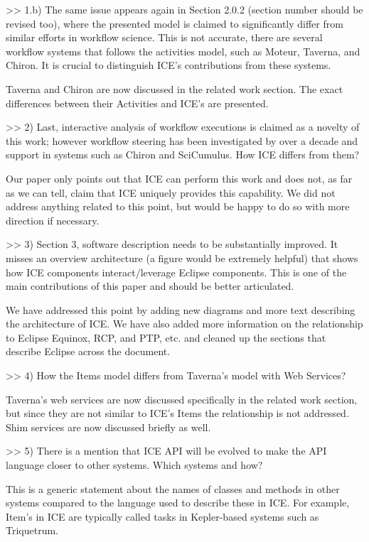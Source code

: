 >> 1.b) The same issue appears again in Section 2.0.2 (section number should be revised too), where the presented model is claimed to significantly differ from similar efforts in workflow science. This is not accurate, there are several workflow systems that follows the activities model, such as Moteur, Taverna, and Chiron. It is crucial to distinguish ICE's contributions from these systems. 

Taverna and Chiron are now discussed in the related work section. The exact differences between their Activities and ICE's are presented.

>> 2) Last, interactive analysis of workflow executions is claimed as a novelty of this work; however workflow steering has been investigated by over a decade and support in systems such as Chiron and SciCumulus. How ICE differs from them?

Our paper only points out that ICE can perform this work and does not, as far as we can tell, claim that ICE uniquely provides this capability.  We did not address anything related to this point, but would be happy to do so with more direction if necessary.

>> 3) Section 3, software description needs to be substantially improved. It misses an overview architecture (a figure would be extremely helpful) that shows how ICE components interact/leverage Eclipse components. This is one of the main contributions of this paper and should be better articulated.

We have addressed this point by adding new diagrams and more text describing the architecture of ICE. We have also added more information on the relationship to Eclipse Equinox, RCP, and PTP, etc. and cleaned up the sections that describe Eclipse across the document.

>> 4) How the Items model differs from Taverna's model with Web Services?

Taverna's web services are now discussed specifically in the related work section, but since they are not similar to ICE's Items the relationship is not addressed. Shim services are now discussed briefly as well.

>> 5) There is a mention that ICE API will be evolved to make the API language closer to other systems. Which systems and how?

This is a generic statement about the names of classes and methods in other systems compared to the language used to describe these in ICE. For example, Item's in ICE are typically called tasks in Kepler-based systems such as Triquetrum. 

